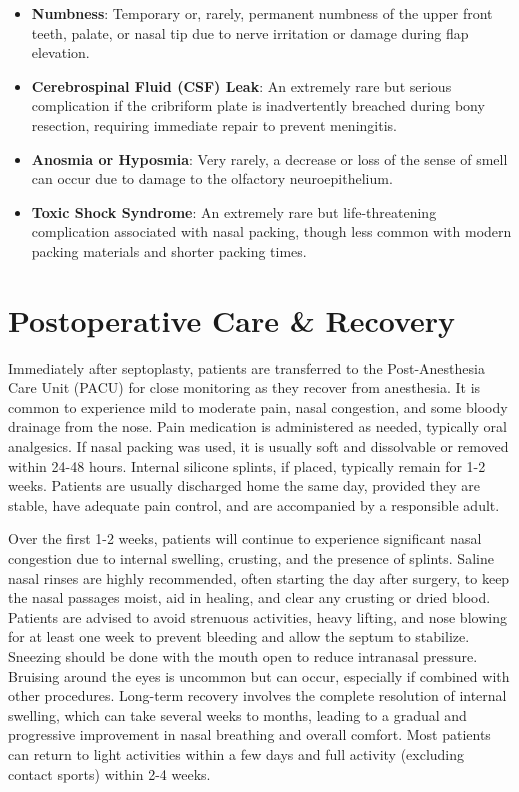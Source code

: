 \begin{itemize}
\begin{itemize}
      \item \textbf{Numbness}: Temporary or, rarely, permanent numbness of the upper front teeth, palate, or nasal tip due to nerve irritation or damage during flap elevation.
      \item \textbf{Cerebrospinal Fluid (CSF) Leak}: An extremely rare but serious complication if the cribriform plate is inadvertently breached during bony resection, requiring immediate repair to prevent meningitis.
      \item \textbf{Anosmia or Hyposmia}: Very rarely, a decrease or loss of the sense of smell can occur due to damage to the olfactory neuroepithelium.
      \item \textbf{Toxic Shock Syndrome}: An extremely rare but life-threatening complication associated with nasal packing, though less common with modern packing materials and shorter packing times.
    \end{itemize}
\end{itemize}

\section*{Postoperative Care \& Recovery}
Immediately after septoplasty, patients are transferred to the Post-Anesthesia Care Unit (PACU) for close monitoring as they recover from anesthesia. It is common to experience mild to moderate pain, nasal congestion, and some bloody drainage from the nose. Pain medication is administered as needed, typically oral analgesics. If nasal packing was used, it is usually soft and dissolvable or removed within 24-48 hours. Internal silicone splints, if placed, typically remain for 1-2 weeks. Patients are usually discharged home the same day, provided they are stable, have adequate pain control, and are accompanied by a responsible adult.

Over the first 1-2 weeks, patients will continue to experience significant nasal congestion due to internal swelling, crusting, and the presence of splints. Saline nasal rinses are highly recommended, often starting the day after surgery, to keep the nasal passages moist, aid in healing, and clear any crusting or dried blood. Patients are advised to avoid strenuous activities, heavy lifting, and nose blowing for at least one week to prevent bleeding and allow the septum to stabilize. Sneezing should be done with the mouth open to reduce intranasal pressure. Bruising around the eyes is uncommon but can occur, especially if combined with other procedures. Long-term recovery involves the complete resolution of internal swelling, which can take several weeks to months, leading to a gradual and progressive improvement in nasal breathing and overall comfort. Most patients can return to light activities within a few days and full activity (excluding contact sports) within 2-4 weeks.

